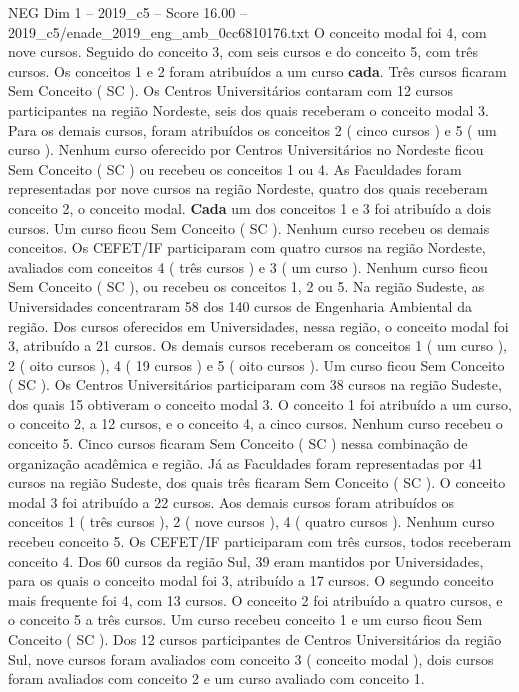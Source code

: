 \begin{textsample}{NEG Dim 1 – 2019\_c5 – Score 16.00 – 2019\_c5/enade\_2019\_eng\_amb\_0cc6810176.txt}
O conceito modal foi 4, com nove cursos.
Seguido do conceito 3, com seis cursos e do conceito 5, com três cursos.
Os conceitos 1 e 2 foram atribuídos a um curso \textbf{cada}.
Três cursos ficaram Sem Conceito ( SC ).
Os Centros Universitários contaram com 12 cursos participantes na região Nordeste, seis dos quais receberam o conceito modal 3.
Para os demais cursos, foram atribuídos os conceitos 2 ( cinco cursos ) e 5 ( um curso ).
Nenhum curso oferecido por Centros Universitários no Nordeste ficou Sem Conceito ( SC ) ou recebeu os conceitos 1 ou 4.
As Faculdades foram representadas por nove cursos na região Nordeste, quatro dos quais receberam conceito 2, o conceito modal. \textbf{Cada} um dos conceitos 1 e 3 foi atribuído a dois cursos.
Um curso ficou Sem Conceito ( SC ).
Nenhum curso recebeu os demais conceitos.
Os CEFET/IF participaram com quatro cursos na região Nordeste, avaliados com conceitos 4 ( três cursos ) e 3 ( um curso ).
Nenhum curso ficou Sem Conceito ( SC ), ou recebeu os conceitos 1, 2 ou 5.
Na região Sudeste, as Universidades concentraram 58 dos 140 cursos de Engenharia Ambiental da região.
Dos cursos oferecidos em Universidades, nessa região, o conceito modal foi 3, atribuído a 21 cursos.
Os demais cursos receberam os conceitos 1 ( um curso ), 2 ( oito cursos ), 4 ( 19 cursos ) e 5 ( oito cursos ).
Um curso ficou Sem Conceito ( SC ).
Os Centros Universitários participaram com 38 cursos na região Sudeste, dos quais 15 obtiveram o conceito modal 3.
O conceito 1 foi atribuído a um curso, o conceito 2, a 12 cursos, e o conceito 4, a cinco cursos.
Nenhum curso recebeu o conceito 5.
Cinco cursos ficaram Sem Conceito ( SC ) nessa combinação de organização acadêmica e região.
Já as Faculdades foram representadas por 41 cursos na região Sudeste, dos quais três ficaram Sem Conceito ( SC ).
O conceito modal 3 foi atribuído a 22 cursos.
Aos demais cursos foram atribuídos os conceitos 1 ( três cursos ), 2 ( nove cursos ), 4 ( quatro cursos ).
Nenhum curso recebeu conceito 5.
Os CEFET/IF participaram com três cursos, todos receberam conceito 4.
Dos 60 cursos da região Sul, 39 eram mantidos por Universidades, para os quais o conceito modal foi 3, atribuído a 17 cursos.
O segundo conceito mais frequente foi 4, com 13 cursos.
O conceito 2 foi atribuído a quatro cursos, e o conceito 5 a três cursos.
Um curso recebeu conceito 1 e um curso ficou Sem Conceito ( SC ).
Dos 12 cursos participantes de Centros Universitários da região Sul, nove cursos foram avaliados com conceito 3 ( conceito modal ), dois cursos foram avaliados com conceito 2 e um curso avaliado com conceito 1.

\end{textsample}
